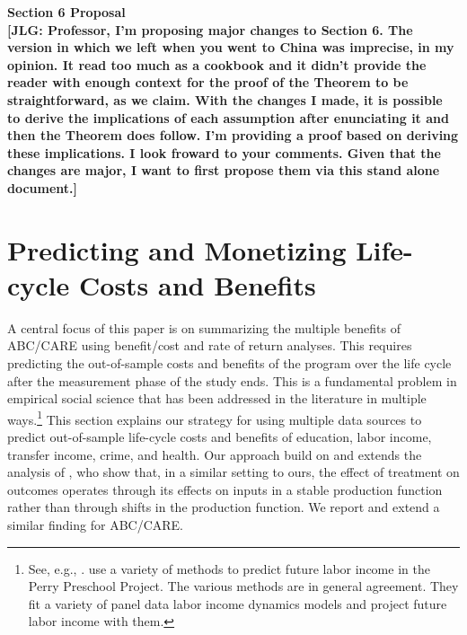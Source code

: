 


\newcommand*\leftright[2]{%
  \leavevmode
  \rlap{#1}%
  \hspace{0.5\linewidth}%
  #2}

\newcommand{\orth}{\ensuremath{\perp\!\!\!\perp}}%
\newcommand{\indep}{\orth}%
\newcommand{\notorth}{\ensuremath{\perp\!\!\!\!\!\!\diagup\!\!\!\!\!\!\perp}}%
\newcommand{\notindep}{\notorth}




\doublespacing
\noindent \textbf{Section 6 Proposal}\\

\noindent \textbf{[JLG: Professor, I'm proposing major changes to Section 6. The version in which we left when you went to China was imprecise, in my opinion. It read too much as a cookbook and it didn't provide the reader with enough context for the proof of the Theorem to be straightforward, as we claim. With the changes I made, it is possible to derive the implications of each assumption after enunciating it and then the Theorem does follow. I'm providing a proof based on deriving these implications. I look froward to your comments. Given that the changes are major, I want to first propose them via this stand alone document.]}

\setcounter{section}{5}
\section{Predicting and Monetizing Life-cycle Costs and Benefits} \label{section:cbamethodology}

\noindent A central focus of this paper is on summarizing the multiple benefits of ABC/CARE using benefit/cost and rate of return analyses. This requires predicting the out-of-sample costs and benefits of the program over the life cycle after the measurement phase of the study ends. This is a fundamental problem in empirical social science that has been addressed in the literature in multiple ways.\footnote{See, e.g., \cite{Heckman_Lochner_ea_2006_HEE}. \citet{Heckman_Moon_etal_2010_RateofReturn} use a variety of methods to predict future labor income in the Perry Preschool Project. The various methods are in general agreement. They fit a variety of panel data labor income dynamics models and project future labor income with them.} This section explains our strategy for using multiple data sources to predict out-of-sample life-cycle costs and benefits of education, labor income, transfer income, crime, and health. Our approach build on and extends the analysis of \citet{Heckman_Pinto_etal_2013_PerryFactor}, who show that, in a similar setting to ours, the effect of treatment on outcomes operates through its effects on inputs in a stable production function rather than through shifts in the production function. We report and extend a similar finding for ABC/CARE.\\

